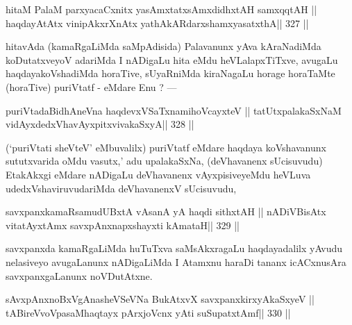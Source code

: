 \begin{shl}
hitaM PalaM parxyacaCxnitx yasAmxtatxsAmxdidhxtAH samxqqtAH ||
haqdayAtAtx vinipAkxrXnAtx yathA\s kARdarxshamxyasatxthA\hfill || 327 ||
\end{shl}

\begin{artha}
hitavAda (kamaRgaLiMda saMpAdisida) Palavanunx yAva kAraNadiMda koDutatxveyoV adariMda I nADigaLu hita eMdu heVLalapxTiTxve, avugaLu haqdayakoVshadiMda horaTive, sUyaRniMda kiraNagaLu horage horaTaMte (horaTive) puriVtatf - eMdare Enu ? ---
\end{artha}

\begin{shl}
puriVtadaBidhAneVna haqdevxVSaTxnamihoVcayxteV ||
tatUtxpalakaSxNaM vidAyxdedxVhavAyxpitxvivakaSxyA\hfill || 328 ||
\end{shl}

\begin{artha}
(`puriVtati sheVteV' eMbuvalilx) puriVtatf eMdare haqdaya koVshavanunx sututxvarida oMdu vasutx,' adu upalakaSxNa, (deVhavanenx sUcisuvudu) EtakAkxgi eMdare nADigaLu deVhavanenx vAyxpisiveyeMdu heVLuva udedxVshaviruvudariMda deVhavanenxV sUcisuvudu,
\end{artha}

\begin{shl}
savxpanxkamaRsamudUBxtA vAsanA yA haqdi sithxtAH ||
nADiVBisAtx vitatAyx\s\s tAmx savxpAnxnapxshayxti  kAmataH\hfill || 329 ||
\end{shl}

\begin{artha}
savxpanxda kamaRgaLiMda huTuTxva saMsAkxragaLu haqdayadalilx yAvudu nelasiveyo avugaLanunx nADigaLiMda I Atamxnu haraDi tananx icACxnusAra savxpanxgaLanunx noVDutAtxne.
\end{artha}

\begin{shl}
sAvxpAnxnoBxVgAnasheVSeVNa BukAtxvX savxpanxkirxyAkaSxyeV ||
\footnotemark[6]tABireVvoVpasaMhaqtayx pArxjoVcnx yAti suSupatxtAmf\hfill || 330 ||
\end{shl}

